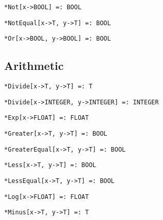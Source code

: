\protect \large \begin{verbatim}
*Not[x->BOOL] =: BOOL
\end{verbatim}\normalsize


\protect \large \begin{verbatim}
*NotEqual[x->T, y->T] =: BOOL
\end{verbatim}\normalsize


\protect \large \begin{verbatim}
*Or[x->BOOL, y->BOOL] =: BOOL
\end{verbatim} \normalsize


\medskip
\subsection{Arithmetic}


\protect \large \begin{verbatim}
*Divide[x->T, y->T] =: T
\end{verbatim} \normalsize


\protect \large \begin{verbatim}
*Divide[x->INTEGER, y->INTEGER] =: INTEGER
\end{verbatim} \normalsize


\protect \large \begin{verbatim}
*Exp[x->FLOAT] =: FLOAT
\end{verbatim} \normalsize


\protect \large \begin{verbatim}
*Greater[x->T, y->T] =: BOOL
\end{verbatim}\normalsize


\protect \large \begin{verbatim}
*GreaterEqual[x->T, y->T] =: BOOL
\end{verbatim}\normalsize


\protect \large \begin{verbatim}
*Less[x->T, y->T] =: BOOL
\end{verbatim}\normalsize


\protect \large \begin{verbatim}
*LessEqual[x->T, y->T] =: BOOL
\end{verbatim}\normalsize


\protect \large \begin{verbatim}
*Log[x->FLOAT] =: FLOAT
\end{verbatim} \normalsize


\protect \large \begin{verbatim}
*Minus[x->T, y->T] =: T
\end{verbatim} \normalsize


